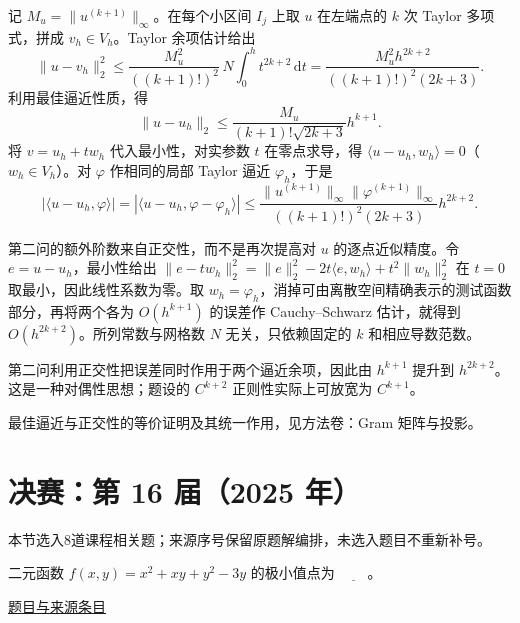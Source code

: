 \documentclass[12pt,fontset=fandol]{ctexart}
\begin{document}
\begin{solve}\label{ans:fin15-high:13}

记 $M_u=\|u^{(k+1)}\|_\infty$。在每个小区间 $I_j$ 上取 $u$ 在左端点的 $k$ 次 Taylor 多项式，拼成 $v_h\in V_h$。Taylor 余项估计给出
\[
\|u-v_h\|_2^2
\le\frac{M_u^2}{((k+1)!)^2}\,N\int_0^ht^{2k+2}\,\mathrm dt
=\frac{M_u^2h^{2k+2}}{((k+1)!)^2(2k+3)}.
\]
利用最佳逼近性质，得
\[
\|u-u_h\|_2\le\frac{M_u}{(k+1)!\sqrt{2k+3}}h^{k+1}.
\]
将 $v=u_h+tw_h$ 代入最小性，对实参数 $t$ 在零点求导，得 $\langle u-u_h,w_h\rangle=0$（$w_h\in V_h$）。对 $\varphi$ 作相同的局部 Taylor 逼近 $\varphi_h$，于是
\[
|\langle u-u_h,\varphi\rangle|
=|\langle u-u_h,\varphi-\varphi_h\rangle|
\le\frac{\|u^{(k+1)}\|_\infty\|\varphi^{(k+1)}\|_\infty}
{((k+1)!)^2(2k+3)}h^{2k+2}.
\]

第二问的额外阶数来自正交性，而不是再次提高对 $u$ 的逐点近似精度。令 $e=u-u_h$，最小性给出 $\|e-tw_h\|_2^2=\|e\|_2^2-2t\langle e,w_h\rangle+t^2\|w_h\|_2^2$ 在 $t=0$ 取最小，因此线性系数为零。取 $w_h=\varphi_h$，消掉可由离散空间精确表示的测试函数部分，再将两个各为 $O(h^{k+1})$ 的误差作 Cauchy--Schwarz 估计，就得到 $O(h^{2k+2})$。所列常数与网格数 $N$ 无关，只依赖固定的 $k$ 和相应导数范数。

\end{solve}

\begin{remark}[方法与条件]第二问利用正交性把误差同时作用于两个逼近余项，因此由 $h^{k+1}$ 提升到 $h^{2k+2}$。这是一种对偶性思想；题设的 $C^{k+2}$ 正则性实际上可放宽为 $C^{k+1}$。

最佳逼近与正交性的等价证明及其统一作用，见方法卷：Gram 矩阵与投影。\end{remark}

\section{决赛：第 16 届（2025 年）}

本节选入8道课程相关题；来源序号保留原题解编排，未选入题目不重新补号。

\begin{example}[来源序号2]\label{ex:fin16-high:2}\label{pr:fin16-high:2}

二元函数 $f(x,y) = x^2 + xy + y^2 - 3y$ 的极小值点为 $\underline{\qquad}$。

\par\href{https://github.com/lzxcr/cmc-mathematics/blob/64916fa1fdbc3e444a652eca204d5669058ee321/src/problems/finals/16/02.md}{题目与来源条目}

\end{example}
\end{document}
